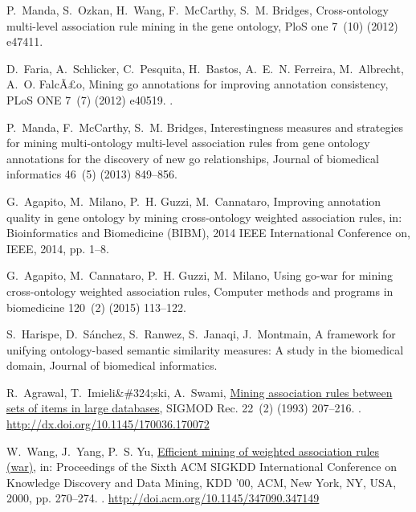 \documentclass{article}
\theoremstyle{definition}
\begin{document}
\begin{thebibliography}{10}
P.~Manda, S.~Ozkan, H.~Wang, F.~McCarthy, S.~M. Bridges, Cross-ontology
  multi-level association rule mining in the gene ontology, PloS one 7~(10)
  (2012) e47411.

D.~Faria, A.~Schlicker, C.~Pesquita, H.~Bastos, A.~E.~N. Ferreira, M.~Albrecht,
  A.~O. FalcÃ£o, Mining go annotations for improving annotation consistency,
  PLoS ONE 7~(7) (2012) e40519.
\newblock \href {http://dx.doi.org/10.1371/journal.pone.0040519}
  {}.

P.~Manda, F.~McCarthy, S.~M. Bridges, Interestingness measures and strategies
  for mining multi-ontology multi-level association rules from gene ontology
  annotations for the discovery of new go relationships, Journal of biomedical
  informatics 46~(5) (2013) 849--856.

G.~Agapito, M.~Milano, P.~H. Guzzi, M.~Cannataro, Improving annotation quality
  in gene ontology by mining cross-ontology weighted association rules, in:
  Bioinformatics and Biomedicine (BIBM), 2014 IEEE International Conference on,
  IEEE, 2014, pp. 1--8.

G.~Agapito, M.~Cannataro, P.~H. Guzzi, M.~Milano, Using go-war for mining
  cross-ontology weighted association rules, Computer methods and programs in
  biomedicine 120~(2) (2015) 113--122.

S.~Harispe, D.~S{\'a}nchez, S.~Ranwez, S.~Janaqi, J.~Montmain, A framework for
  unifying ontology-based semantic similarity measures: A study in the
  biomedical domain, Journal of biomedical informatics.

R.~Agrawal, T.~Imieli\&\#324;ski, A.~Swami,
  \href{http://dx.doi.org/10.1145/170036.170072}{Mining association rules
  between sets of items in large databases}, SIGMOD Rec. 22~(2) (1993)
  207--216.
\newblock \href {http://dx.doi.org/10.1145/170036.170072}
  {}.
\newline\urlprefix\url{http://dx.doi.org/10.1145/170036.170072}

W.~Wang, J.~Yang, P.~S. Yu,
  \href{http://doi.acm.org/10.1145/347090.347149}{Efficient mining of weighted
  association rules (war)}, in: Proceedings of the Sixth ACM SIGKDD
  International Conference on Knowledge Discovery and Data Mining, KDD '00,
  ACM, New York, NY, USA, 2000, pp. 270--274.
\newblock \href {http://dx.doi.org/10.1145/347090.347149}
  {}.
\newline\urlprefix\url{http://doi.acm.org/10.1145/347090.347149}


\end{thebibliography}
\end{document}
